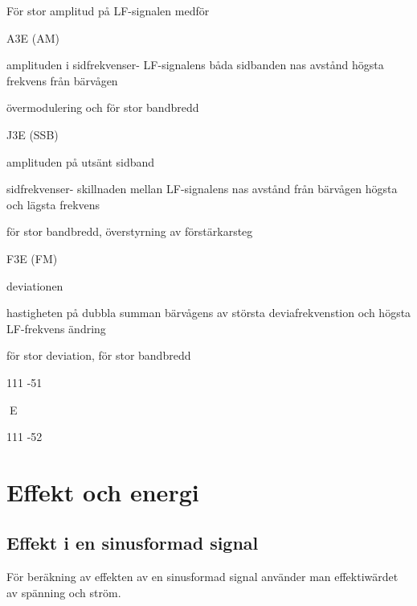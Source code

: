 \documentclass[a4paper,twoside,twocolumn,openright]{book}
\begin{document}
För stor amplitud
på LF-signalen
medför

A3E (AM)

amplituden i
sidfrekvenser- LF-signalens
båda sidbanden nas avstånd
högsta frekvens
från bärvågen

övermodulering
och för stor bandbredd

J3E (SSB)

amplituden på
utsänt sidband

sidfrekvenser- skillnaden mellan
LF-signalens
nas avstånd
från bärvågen högsta och lägsta
frekvens

för stor bandbredd,
överstyrning av
förstärkarsteg

F3E (FM)

deviationen

hastigheten på dubbla summan
bärvågens
av största deviafrekvenstion och högsta
LF-frekvens
ändring

för stor deviation,
för stor bandbredd

111 -51

E

111 -52

\cleardoublepage

\section{Effekt och energi}

\subsection{Effekt i en sinusformad signal}
För beräkning av effekten av en sinusformad signal använder man effektiwärdet
av spänning och ström.
\end{document}
